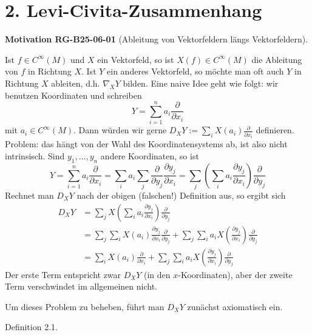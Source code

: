 \documentclass[10pt, letterpaper]{article}
\newcommand{\CustomHeading}[3]{%
  \par\medskip\noindent%
  \textbf{#1 #2} \textnormal{(#3)}.\enskip%
}
\newenvironment{MOT}[2]{\begin{unitbox}\CustomHeading{Motivation}{#1}{#2}}{\end{unitbox}}
\begin{document}
\pagebreak



\section*{2. Levi-Civita-Zusammenhang}



\begin{MOT}{RG-B25-06-01}{Ableitung von Vektorfeldern längs Vektorfeldern}
Ist $f \in C^{\infty}(M)$ und $X$ ein Vektorfeld, so ist $X(f) \in C^{\infty}(M)$ die Ableitung von $f$ in Richtung $X$. Ist $Y$ ein anderes Vektorfeld, so möchte man oft auch $Y$ in Richtung $X$ ableiten, d.h. $\nabla_{X} Y$ bilden. Eine naive Idee geht wie folgt: wir benutzen Koordinaten und schreiben
$$
Y=\sum_{i=1}^{n} a_{i} \frac{\partial}{\partial x_{i}}
$$
mit $a_{i} \in C^{\infty}(M)$. Dann würden wir gerne $D_{X} Y:=\sum_{i} X\left(a_{i}\right) \frac{\partial}{\partial x_{i}}$ definieren. Problem: das hängt von der Wahl des Koordinatensystems ab, ist also nicht intrinsisch. Sind $y_{1}, \ldots, y_{n}$ andere Koordinaten, so ist
$$
Y=\sum_{i=1}^{n} a_{i} \frac{\partial}{\partial x_{i}}=\sum_{i} a_{i} \sum_{j} \frac{\partial}{\partial y_{j}} \frac{\partial y_{j}}{\partial x_{i}}=\sum_{j}\left(\sum_{i} a_{i} \frac{\partial y_{j}}{\partial x_{i}}\right) \frac{\partial}{\partial y_{j}}
$$
Rechnet man $D_{X} Y$ nach der obigen (falschen!) Definition aus, so ergibt sich
$$
\begin{aligned}
D_{X} Y & =\sum_{j} X\left(\sum_{i} a_{i} \frac{\partial y_{j}}{\partial x_{i}}\right) \frac{\partial}{\partial y_{j}} \\
& =\sum_{j} \sum_{i} X\left(a_{i}\right) \frac{\partial y_{j}}{\partial x_{i}} \frac{\partial}{\partial y_{j}}+\sum_{j} \sum_{i} a_{i} X\left(\frac{\partial y_{j}}{\partial x_{i}}\right) \frac{\partial}{\partial y_{j}} \\
& =\sum_{i} X\left(a_{i}\right) \frac{\partial}{\partial x_{i}}+\sum_{j} \sum_{i} a_{i} X\left(\frac{\partial y_{j}}{\partial x_{i}}\right) \frac{\partial}{\partial y_{j}}
\end{aligned}
$$
Der erste Term entspricht zwar $D_{X} Y$ (in den $x$-Koordinaten), aber der zweite Term verschwindet im allgemeinen nicht.

Um dieses Problem zu beheben, führt man $D_{X} Y$ zunächst axiomatisch ein.
\end{MOT}



Definition 2.1. 
\end{document}
